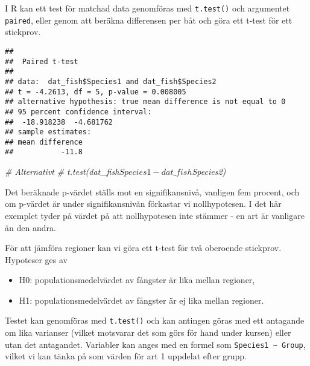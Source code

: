 \documentclass[
]{book}
\newenvironment{Shaded}{\begin{snugshade}}{\end{snugshade}}
\newcommand{\AttributeTok}[1]{\textcolor[rgb]{0.77,0.63,0.00}{#1}}
\newcommand{\CommentTok}[1]{\textcolor[rgb]{0.56,0.35,0.01}{\textit{#1}}}
\newcommand{\FunctionTok}[1]{\textcolor[rgb]{0.00,0.00,0.00}{#1}}
\newcommand{\NormalTok}[1]{#1}
\newcommand{\SpecialCharTok}[1]{\textcolor[rgb]{0.00,0.00,0.00}{#1}}
\providecommand{\tightlist}{%
  \setlength{\itemsep}{0pt}\setlength{\parskip}{0pt}}
\theoremstyle{definition}
\theoremstyle{definition}
\theoremstyle{definition}
\theoremstyle{definition}
\theoremstyle{remark}
\begin{document}
I R kan ett test för matchad data genomföras med \texttt{t.test()} och argumentet \texttt{paired}, eller genom att beräkna differensen per båt och göra ett t-test för ett stickprov.

\begin{Shaded}
\end{Shaded}

\begin{verbatim}
## 
##  Paired t-test
## 
## data:  dat_fish$Species1 and dat_fish$Species2
## t = -4.2613, df = 5, p-value = 0.008005
## alternative hypothesis: true mean difference is not equal to 0
## 95 percent confidence interval:
##  -18.918238  -4.681762
## sample estimates:
## mean difference 
##           -11.8
\end{verbatim}

\begin{Shaded}
\begin{Highlighting}[]
\CommentTok{\# Alternativt}
\CommentTok{\# t.test(dat\_fish$Species1 {-} dat\_fish$Species2)}
\end{Highlighting}
\end{Shaded}

Det beräknade p-värdet ställs mot en signifikansnivå, vanligen fem procent, och om p-värdet är under signifikansnivån förkastar vi nollhypotesen. I det här exemplet tyder på värdet på att nollhypotesen inte stämmer - en art är vanligare än den andra.

För att jämföra regioner kan vi göra ett t-test för två oberoende stickprov. Hypoteser ges av

\begin{itemize}
\tightlist
\item
  H0: populationsmedelvärdet av fångster är lika mellan regioner,
\item
  H1: populationsmedelvärdet av fångster är ej lika mellan regioner.
\end{itemize}

Testet kan genomföras med \texttt{t.test()} och kan antingen göras med ett antagande om lika varianser (vilket motsvarar det som görs för hand under kursen) eller utan det antagandet. Variabler kan anges med en formel som \texttt{Species1\ \textasciitilde{}\ Group}, vilket vi kan tänka på som värden för art 1 uppdelat efter grupp.
\end{document}
